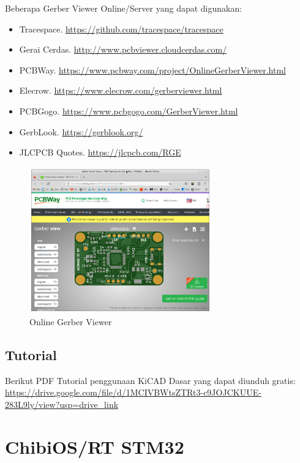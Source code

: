 \documentclass[12pt]{book}
\begin{document}
	Beberapa Gerber Viewer Online/Server yang dapat digunakan:
	
	\begin{itemize}
		\item Tracespace. \url{https://github.com/tracespace/tracespace}
		\item Gerai Cerdas. \url{http://www.pcbviewer.cloudcerdas.com/}
		\item PCBWay. \url{https://www.pcbway.com/project/OnlineGerberViewer.html}
		\item Elecrow. \url{https://www.elecrow.com/gerberviewer.html}
		\item PCBGogo. \url{https://www.pcbgogo.com/GerberViewer.html}
		\item GerbLook. \url{https://gerblook.org/}
		\item JLCPCB Quotes. \url{https://jlcpcb.com/RGE}
	\end{itemize}
	
	\newpage
	\begin{figure}[!ht]
		\centering
		\includegraphics[width=0.7\textwidth]{images/kicad/gerbvonline}
		\caption{Online Gerber Viewer}
	\end{figure}
	
	\section{Tutorial}
	
	Berikut PDF Tutorial penggunaan KiCAD Dasar yang dapat diunduh gratis: \\
	\url{https://drive.google.com/file/d/1MCIVBWtsZTRt3-c9JOJCKUUE-283L9ly/view?usp=drive_link}
	
	
	\newpage
	\chapter{ChibiOS/RT STM32}
	
\end{document}
